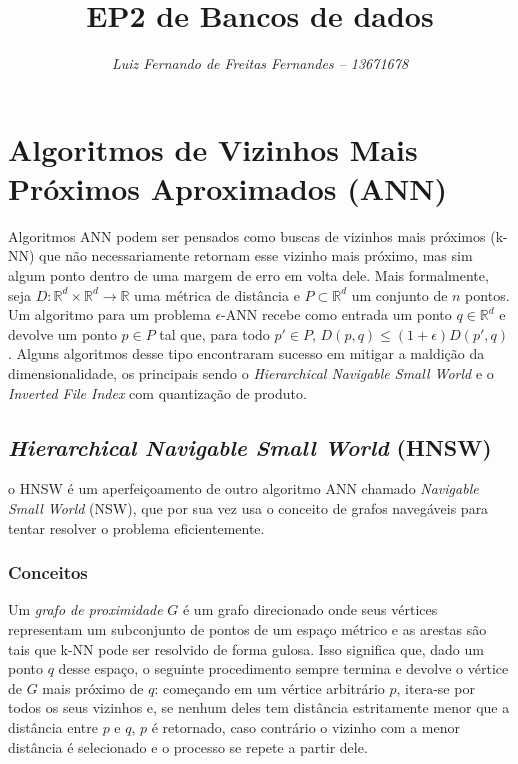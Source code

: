 \documentclass[a4paper, 12pt]{article} %
\title{\textbf{EP2 de Bancos de dados}}
\author{\small\textit{ Luiz Fernando de Freitas Fernandes -- 13671678}}
\begin{document}
\maketitle


\section{Algoritmos de Vizinhos Mais Próximos Aproximados (ANN)}

Algoritmos ANN podem ser pensados como buscas de vizinhos mais próximos (k-NN) que não necessariamente retornam esse vizinho mais próximo, mas sim algum ponto dentro de uma margem de erro em volta dele. Mais formalmente, seja $D: \mathbb{R}^d \times \mathbb{R}^d \rightarrow \mathbb{R}$ uma métrica de distância e $P \subset \mathbb{R}^d$ um conjunto de $n$ pontos. Um algoritmo para um problema $\epsilon$-ANN recebe como entrada um ponto $q \in \mathbb{R}^d$ e devolve um ponto $p \in P$ tal que, para todo $p' \in P$, $D(p, q) \leq (1 + \epsilon)D(p', q)$. Alguns algoritmos desse tipo encontraram sucesso em mitigar a maldição da dimensionalidade, os principais sendo o \textit{Hierarchical Navigable Small World} e o \textit{Inverted File Index} com quantização de produto.

\subsection{\textit{Hierarchical Navigable Small World} (HNSW)}

o HNSW é um aperfeiçoamento de outro algoritmo ANN chamado \textit{Navigable Small World} (NSW), que por sua vez usa o conceito de grafos navegáveis para tentar resolver o problema eficientemente.

\subsubsection{Conceitos}

Um \textit{grafo de proximidade} $G$ é um grafo direcionado onde seus vértices representam um subconjunto de pontos de um espaço métrico e as arestas são tais que k-NN pode ser resolvido de forma gulosa. Isso significa que, dado um ponto $q$ desse espaço, o seguinte procedimento sempre termina e devolve o vértice de $G$ mais próximo de $q$: começando em um vértice arbitrário $p$, itera-se por todos os seus vizinhos e, se nenhum deles tem distância estritamente menor que a distância entre $p$ e $q$, $p$ é retornado, caso contrário o vizinho com a menor distância é selecionado e o processo se repete a partir dele.
\end{document}
